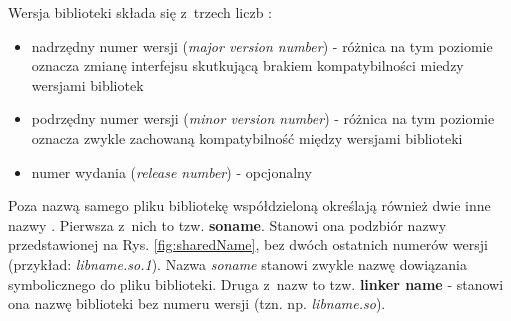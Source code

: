 Wersja biblioteki składa się z~trzech liczb \cite{TLDP}: 
\begin{itemize}
\item nadrzędny numer wersji (\textit{major version number}) - różnica na tym poziomie oznacza zmianę interfejsu skutkującą brakiem kompatybilności miedzy wersjami bibliotek
\item podrzędny numer wersji (\textit{minor version number}) - różnica na tym poziomie oznacza zwykle zachowaną kompatybilność między wersjami biblioteki
\item numer wydania (\textit{release number}) - opcjonalny
\end{itemize}

Poza nazwą samego pliku bibliotekę współdzieloną określają również dwie inne nazwy \cite{SharedNames}. Pierwsza z~nich to tzw. \textbf{soname}. Stanowi ona podzbiór nazwy przedstawionej na Rys. \ref{fig:sharedName}, bez dwóch ostatnich numerów wersji (przykład: \textit{libname.so.1}). Nazwa \textit{soname} stanowi zwykle nazwę dowiązania symbolicznego do pliku biblioteki. Druga z~nazw to tzw. \textbf{linker name} - stanowi ona nazwę biblioteki bez numeru wersji (tzn. np. \textit{libname.so}).


